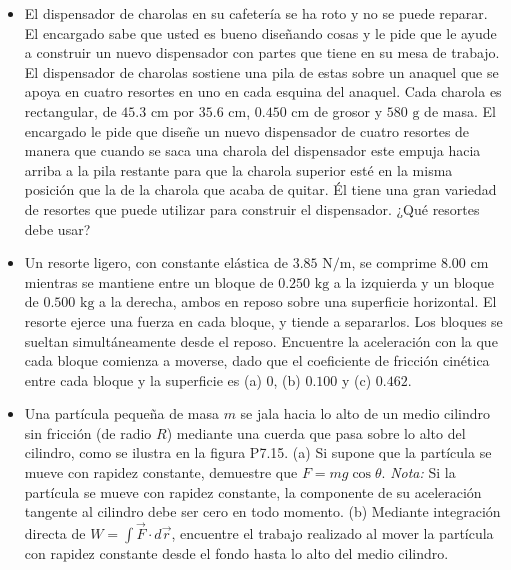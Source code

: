 \documentclass[11pt,a4paper]{article}
\begin{document}
\begin{itemize}
    \item[\textbf{13.}] El dispensador de charolas en su cafetería se ha roto y no se puede reparar. El encargado sabe que usted es bueno diseñando cosas y le pide que le ayude a construir un nuevo dispensador con partes que tiene en su mesa de trabajo. El dispensador de charolas sostiene una pila de estas sobre un anaquel que se apoya en cuatro resortes en uno en cada esquina del anaquel. Cada charola es rectangular, de $45.3 \text{ cm}$ por $35.6 \text{ cm}$, $0.450 \text{ cm}$ de grosor y $580 \text{ g}$ de masa. El encargado le pide que diseñe un nuevo dispensador de cuatro resortes de manera que cuando se saca una charola del dispensador este empuja hacia arriba a la pila restante para que la charola superior esté en la misma posición que la de la charola que acaba de quitar. Él tiene una gran variedad de resortes que puede utilizar para construir el dispensador. ¿Qué resortes debe usar?
    \vspace*{7cm}

    \item[\textbf{14.}] Un resorte ligero, con constante elástica de $3.85 \text{ N/m}$, se comprime $8.00 \text{ cm}$ mientras se mantiene entre un bloque de $0.250 \text{ kg}$ a la izquierda y un bloque de $0.500 \text{ kg}$ a la derecha, ambos en reposo sobre una superficie horizontal. El resorte ejerce una fuerza en cada bloque, y tiende a separarlos. Los bloques se sueltan simultáneamente desde el reposo. Encuentre la aceleración con la que cada bloque comienza a moverse, dado que el coeficiente de fricción cinética entre cada bloque y la superficie es (a) $0$, (b) $0.100$ y (c) $0.462$.
    \vspace*{7cm}

    \item[\textbf{15.}] Una partícula pequeña de masa $m$ se jala hacia lo alto de un medio cilindro sin fricción (de radio $R$) mediante una cuerda que pasa sobre lo alto del cilindro, como se ilustra en la figura P7.15. (a) Si supone que la partícula se mueve con rapidez constante, demuestre que $F = mg \cos\theta$. \textit{Nota:} Si la partícula se mueve con rapidez constante, la componente de su aceleración tangente al cilindro debe ser cero en todo momento. (b) Mediante integración directa de $W = \int \vec{F} \cdot d\vec{r}$, encuentre el trabajo realizado al mover la partícula con rapidez constante desde el fondo hasta lo alto del medio cilindro.
    \vspace*{7cm}
\end{itemize}
\end{document}
